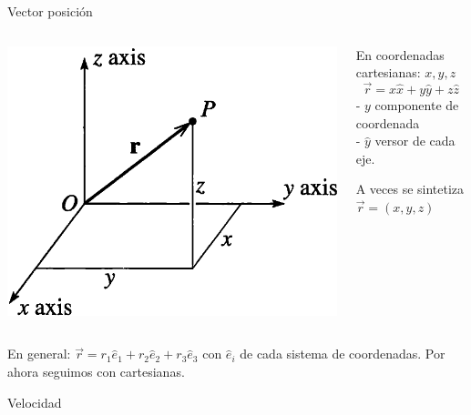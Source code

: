 \documentclass[serif]{beamer}
\begin{document}
\begin{frame}
\begin{block}{Vector posición}
\begin{columns}[c]
      \begin{column}{0.65\textwidth}
        \includegraphics[width=\textwidth]{taylor1_1}
        \end{column}
        \begin{column}{0.35\textwidth}
En coordenadas cartesianas: \(x,y,z\)
\[
\vec{r}= x \hat{x}+ y \hat{y}+ z \hat{z}
\]
- \(y\) componente de coordenada\\
- \(\hat{y}\) versor de cada eje.

A veces se sintetiza
\(\vec{r}= (x,y,z)\)
\end{column}
\end{columns}
\end{block}
\pause
\begin{block}{}
En general: \(\vec{r}= r_1 \hat{e}_1 +  r_2 \hat{e}_2 + r_3 \hat{e}_3\) con \(\hat{e}_i\) de cada sistema de coordenadas.
Por ahora seguimos con cartesianas.
\end{block}
\end{frame}


\begin{frame}
\begin{block}{Velocidad}
\end{block}

\end{frame}
\end{document}
